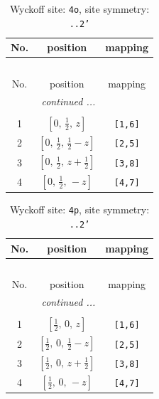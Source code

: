 \documentclass[fleqn,8pt]{jsarticle}
\begin{document}
\renewcommand{\arraystretch}{1.2}
\begin{longtable}{ccc}
\caption{Wyckoff site: {\tt 4o}, site symmetry: {\tt ..2'}}
 \\
 \hline \hline
No. & position & mapping \\ \hline \endfirsthead

\multicolumn{2}{l}{\tablename\ \thetable{}} \\
 \hline \hline
No. & position & mapping \\ \hline \endhead

 \hline \hline
\multicolumn{2}{r}{\footnotesize\it continued ...} \\ \endfoot

 \hline \hline
\multicolumn{2}{r}{} \\ \endlastfoot

1 & $\left[ 0,\, \frac{1}{2},\, z \right]$ & {\tt [1,6]} \\ \hline
2 & $\left[ 0,\, \frac{1}{2},\, \frac{1}{2} - z \right]$ & {\tt [2,5]} \\ \hline
3 & $\left[ 0,\, \frac{1}{2},\, z + \frac{1}{2} \right]$ & {\tt [3,8]} \\ \hline
4 & $\left[ 0,\, \frac{1}{2},\, - z \right]$ & {\tt [4,7]} \\
\end{longtable}
\renewcommand{\arraystretch}{1.2}
\begin{longtable}{ccc}
\caption{Wyckoff site: {\tt 4p}, site symmetry: {\tt ..2'}}
 \\
 \hline \hline
No. & position & mapping \\ \hline \endfirsthead

\multicolumn{2}{l}{\tablename\ \thetable{}} \\
 \hline \hline
No. & position & mapping \\ \hline \endhead

 \hline \hline
\multicolumn{2}{r}{\footnotesize\it continued ...} \\ \endfoot

 \hline \hline
\multicolumn{2}{r}{} \\ \endlastfoot

1 & $\left[ \frac{1}{2},\, 0,\, z \right]$ & {\tt [1,6]} \\ \hline
2 & $\left[ \frac{1}{2},\, 0,\, \frac{1}{2} - z \right]$ & {\tt [2,5]} \\ \hline
3 & $\left[ \frac{1}{2},\, 0,\, z + \frac{1}{2} \right]$ & {\tt [3,8]} \\ \hline
4 & $\left[ \frac{1}{2},\, 0,\, - z \right]$ & {\tt [4,7]} \\
\end{longtable}
\end{document}
